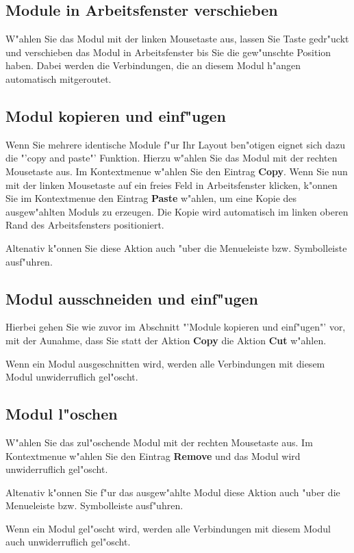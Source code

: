 \documentclass[a4paper,titlepage,12pt,ngerman]{scrbook}
\begin{document}
\subsection{Module in Arbeitsfenster verschieben}
W"ahlen Sie das Modul mit der linken Mousetaste aus, lassen Sie Taste gedr"uckt und verschieben das Modul in Arbeitsfenster bis Sie die gew"unschte Position haben. Dabei werden die Verbindungen, die an diesem Modul h"angen automatisch mitgeroutet.


\subsection{Modul kopieren und einf"ugen}
Wenn Sie mehrere identische Module f"ur Ihr Layout ben"otigen eignet sich dazu die "'copy and paste"' Funktion. Hierzu w"ahlen Sie das Modul mit der rechten Mousetaste aus. Im Kontextmenue w"ahlen Sie den Eintrag {\bf Copy}. Wenn Sie nun mit der linken Mousetaste auf ein freies Feld in Arbeitsfenster
klicken, k"onnen Sie im Kontextmenue den Eintrag {\bf Paste} w"ahlen, um eine Kopie des ausgew"ahlten Moduls zu erzeugen.
Die Kopie wird automatisch im linken oberen Rand des Arbeitsfensters positioniert.\par
Altenativ k"onnen Sie diese Aktion auch "uber die Menueleiste bzw. Symbolleiste ausf"uhren. 


\subsection{Modul ausschneiden und einf"ugen}
Hierbei gehen Sie wie zuvor im Abschnitt "'Module kopieren und einf"ugen"' vor, mit der Aunahme, dass Sie statt der Aktion {\bf Copy} die Aktion {\bf Cut} w"ahlen. \par
Wenn ein Modul ausgeschnitten wird, werden alle Verbindungen mit diesem Modul unwiderruflich gel"oscht.


\subsection{Modul l"oschen}
W"ahlen Sie das zul"oschende Modul mit der rechten Mousetaste aus. Im Kontextmenue w"ahlen Sie den Eintrag {\bf Remove} und das Modul wird unwiderruflich gel"oscht.\par
Altenativ k"onnen Sie f"ur das ausgew"ahlte Modul diese Aktion auch "uber die Menueleiste bzw. Symbolleiste ausf"uhren.\par
Wenn ein Modul gel"oscht wird, werden alle Verbindungen mit diesem Modul auch unwiderruflich gel"oscht.
\end{document}
